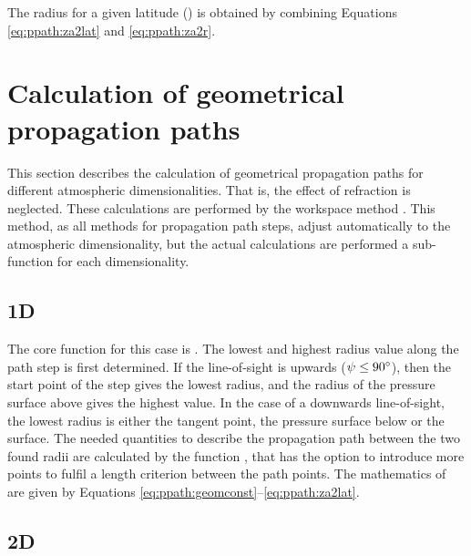 The radius for a given latitude ()
is obtained by combining Equations \ref{eq:ppath:za2lat} and
\ref{eq:ppath:za2r}.



\section{Calculation of geometrical propagation paths}
\label{sec:ppath:stepcalc}

This section describes the calculation of geometrical propagation
paths for different atmospheric dimensionalities. That is, the effect
of refraction is neglected. These calculations are performed by the
workspace method . This method, as all
methods for propagation path steps, adjust automatically to the
atmospheric dimensionality, but the actual calculations are performed
a sub-function for each dimensionality.


\subsection{1D}
\label{sec:ppath:1Dgeom}

The core function for this case is . The
lowest and highest radius value along the path step is first
determined. If the line-of-sight is upwards ($\psi \leq
90^\circ$), then the start point of the step gives the lowest radius,
and the radius of the pressure surface above gives the highest value.
In the case of a downwards line-of-sight, the lowest radius is either
the tangent point, the pressure surface below or the surface. The
needed quantities to describe the propagation path between the two
found radii are calculated by the function
, that has the option to
introduce more points to fulfil a length criterion between the path
points. The mathematics of  are
given by Equations \ref{eq:ppath:geomconst}--\ref{eq:ppath:za2lat}.


\subsection{2D}
\label{sec:ppath:2Dgeom}

